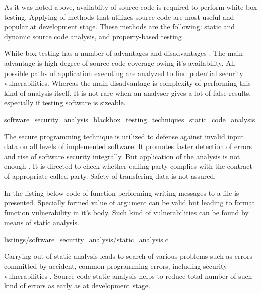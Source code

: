 %
As it was noted above, availablity of source code is required to perform white box testing. 
%
Applying of methods that utilizes source code are most useful and popular at development stage. 
%
These methods are the following: static and dynamic source code analysis, and property-based testing . 

%
White box testing has a number of advantages and disadvantages . 
%
The main advantage is high degree of source code coverage owing it's availability. 
%
All possible paths of application executing are analyzed to find potential security vulnerabilities. 
%
Whereas the main disadvantage is complexity of performing this kind of analysis itself. 
%
It is not rare when an analyser gives a lot of false results, especially if testing software is sizeable. 


	{software_security_analysis_blackbox_testing_techniques_static_code_analysis}

%
The secure programming technique  is utilized to defense against invalid input data on all levels of implemented software. 
%
It promotes faster detection of errors and rise of software security integrally. 
%
But application of the analysis is not enough . 
%
It is directed to check whether calling party complies with the contract of appropriate called party. 
%
Safety of transfering data is not assured. 

%
In the listing below code of function performing writing messages to a file is presented. 
%
Specially formed value of  argument can be valid but leading to  format function vulnerability in it's body. 
%
Such kind of vulnerabilities can be found by means of static analysis. 

	{listings/software_security_analysis/static_analysis.c}

%
Carrying out of static analysis leads to search of various problems such as errors committed by accident, common programming errors, including security vulnerabilities . 
%
Source code static analysis helps to reduce total number of such kind of errors as early as at development stage. 

